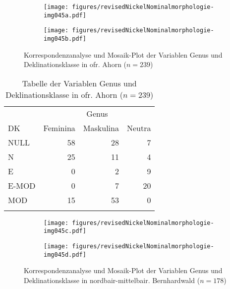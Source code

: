 \begin{figure}
\begin{subfigure}{\textwidth}
\texttt{[image: figures/revisedNickelNominalmorphologie-img045a.pdf]}
\caption{}
\label{fig:14a-1}
\end{subfigure}
\begin{subfigure}{\textwidth}
\texttt{[image: figures/revisedNickelNominalmorphologie-img045b.pdf]}
\caption{}
\label{fig:14a-2}
\end{subfigure}
\caption{Korrespondenzanalyse und Mosaik-Plot der Variablen Genus und Deklinationsklasse in ofr. Ahorn ($n = 239$)}
\label{fig:14a}
\end{figure}

\begin{table}
    \begin{tabular}{lrrr}
    \lsptoprule
         & \multicolumn{3}{c}{Genus} \\
         \cmidrule(lr){2-4}
        DK & Feminina & Maskulina & Neutra\\
        \midrule
        NULL & 58 & 28 & 7\\
        N & 25 & 11 & 4 \\
        E & 0 & 2 & 9 \\
        E-MOD & 0 & 7 & 20\\
        MOD & 15 & 53 & 0\\
        \lspbottomrule
    \end{tabular}
    \caption{Tabelle der Variablen Genus und Deklinationsklasse in ofr. Ahorn ($n = 239$)}
    \label{tabfig:14a}
\end{table}

\begin{figure}
\begin{subfigure}{\textwidth}
\texttt{[image: figures/revisedNickelNominalmorphologie-img045c.pdf]}
\caption{}
\label{fig:14b-1}
\end{subfigure}
\begin{subfigure}{\textwidth}
\texttt{[image: figures/revisedNickelNominalmorphologie-img045d.pdf]}
\caption{}
\label{fig:14b-2}
\end{subfigure}
\caption{Korrespondenzanalyse und Mosaik-Plot der Variablen Genus und Deklinationsklasse in nordbair-mittelbair. Bernhardwald ($n = 178$)}
\label{fig:14b}
\end{figure}


